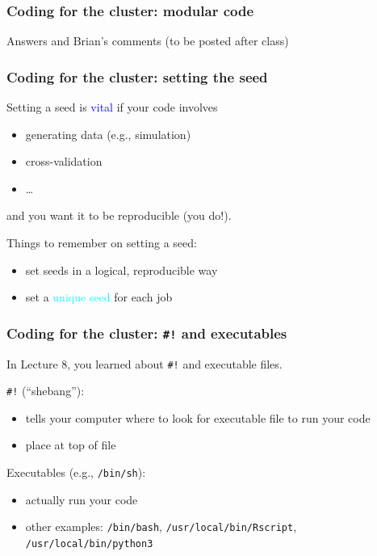 \documentclass[12pt, 
hyperref={colorlinks=true, linkcolor=BlueViolet, urlcolor=BlueViolet},dvipsnames]{beamer}
\begin{document}
\begin{frame}
\frametitle{Coding for the cluster: modular code}

Answers and Brian's comments (to be posted after class)

\end{frame}

\begin{frame}
\frametitle{Coding for the cluster: setting the seed}

Setting a seed is \textcolor{blue}{vital} if your code involves \vspace{-0.3cm} \pause
\begin{itemize}
\item generating data (e.g., simulation) \pause
\item cross-validation \pause
\item \dots \pause
\end{itemize}
and you want it to be reproducible (you do!). \pause

Things to remember on setting a seed: \vspace{-0.3cm} \pause
\begin{itemize}
\item set seeds in a logical, reproducible way \pause
\item set a \textcolor{cyan}{unique seed} for each job \pause
\end{itemize}

\end{frame}

\begin{frame}
\frametitle{Coding for the cluster: \texttt{\#!} and executables}

In Lecture 8, you learned about \texttt{\#!} and executable files. \pause

\texttt{\#!} (``shebang''): \vspace{-0.3cm} \pause
\begin{itemize}
\item tells your computer where to look for executable file to run your code
\item place at top of file \pause
\end{itemize}

Executables (e.g., \texttt{/bin/sh}): \vspace{-0.3cm} \pause
\begin{itemize}
\item actually run your code
\item other examples: \texttt{/bin/bash}, \texttt{/usr/local/bin/Rscript}, \texttt{/usr/local/bin/python3}
\end{itemize}

\end{frame}
\end{document}
